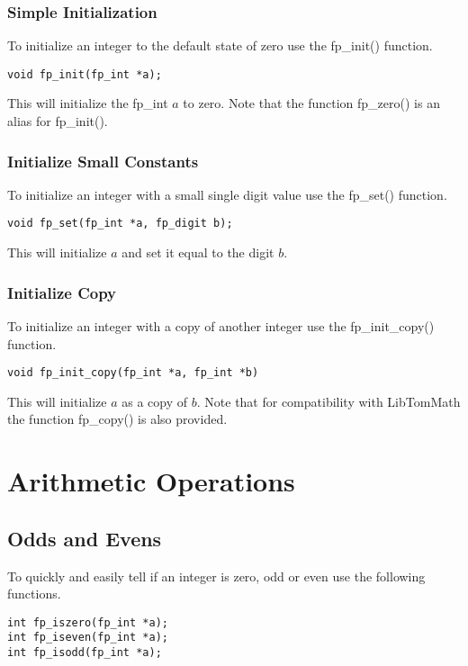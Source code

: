 \documentclass[b5paper]{book}
\begin{document}
\subsection{Simple Initialization}
To initialize an integer to the default state of zero use the fp\_init() function.

\begin{verbatim}
void fp_init(fp_int *a);
\end{verbatim}

This will initialize the fp\_int $a$ to zero.  Note that the function fp\_zero() is an alias
for fp\_init().

\subsection{Initialize Small Constants}
To initialize an integer with a small single digit value use the fp\_set() function.

\begin{verbatim}
void fp_set(fp_int *a, fp_digit b);
\end{verbatim}

This will initialize $a$ and set it equal to the digit $b$.  

\subsection{Initialize Copy}
To initialize an integer with a copy of another integer use the fp\_init\_copy() function.

\begin{verbatim}
void fp_init_copy(fp_int *a, fp_int *b)
\end{verbatim}

This will initialize $a$ as a copy of $b$.  Note that for compatibility with LibTomMath the function
fp\_copy() is also provided.

\chapter{Arithmetic Operations}
\section{Odds and Evens}
To quickly and easily tell if an integer is zero, odd or even use the following functions.

  
\begin{verbatim}
int fp_iszero(fp_int *a);
int fp_iseven(fp_int *a);
int fp_isodd(fp_int *a);
\end{verbatim}
\end{document}
